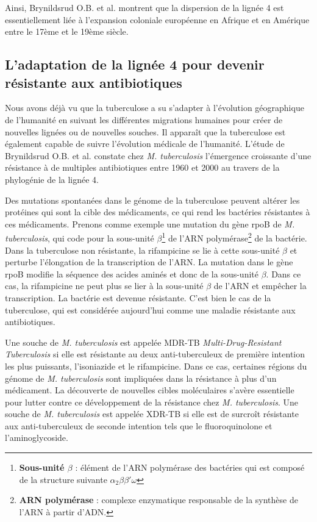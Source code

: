 \documentclass[twoside,a4paper,11pt,frenchb,openany]{report}
\begin{document}
Ainsi, Brynildsrud O.B. et al. montrent que la dispersion de la lignée 4 est essentiellement liée à l'expansion coloniale européenne en Afrique et en Amérique entre le 17ème et le 19ème siècle.


\subsection{L'adaptation de la lignée 4 pour devenir résistante aux antibiotiques}

Nous avons déjà vu que la tuberculose a su s'adapter à l'évolution géographique de l'humanité en suivant les différentes migrations humaines pour créer de nouvelles lignées ou de nouvelles souches. Il apparaît que la tuberculose est également capable de suivre l'évolution médicale de l'humanité. L'étude de Brynildsrud O.B. et al.\cite{brynildsrud} constate chez \textit{M. tuberculosis} l'émergence croissante d'une résistance à de multiples antibiotiques entre 1960 et 2000 au travers de la phylogénie de la lignée 4.

Des mutations spontanées dans le génome de la tuberculose peuvent altérer les protéines qui sont la cible des médicaments, ce qui rend les bactéries résistantes à ces médicaments. Prenons comme exemple une mutation du gène rpoB de \textit{M. tuberculosis}, qui code pour la sous-unité $\beta$\footnote{\textbf{Sous-unité $\beta$} : élément de l'ARN polymérase des bactéries qui est composé de la structure suivante $\alpha_2 \beta \beta' \omega$} de l'ARN polymérase\footnote{\textbf{ARN polymérase} : complexe enzymatique responsable de la synthèse de l'ARN à partir d'ADN.} de la bactérie. Dans la tuberculose non résistante, la rifampicine se lie à cette sous-unité $\beta$ et perturbe l'élongation de la transcription de l'ARN. La mutation dans le gène rpoB modifie la séquence des acides aminés et donc de la sous-unité $\beta$. Dans ce cas, la rifampicine ne peut plus se lier à la sous-unité $\beta$ de l'ARN et empêcher la transcription. La bactérie est devenue résistante. C'est bien le cas de la tuberculose, qui est considérée aujourd'hui comme une maladie résistante aux antibiotiques. 

Une souche de \textit{M. tuberculosis} est appelée MDR-TB \textit{Multi-Drug-Resistant Tuberculosis} si elle est résistante au deux anti-tuberculeux de première intention les plus puissants, l'isoniazide et le rifampicine. Dans ce cas, certaines régions du génome de \textit{M. tuberculosis} sont impliquées dans la résistance à plus d'un médicament. La découverte de nouvelles cibles moléculaires s'avère essentielle pour lutter contre ce développement de la résistance chez \textit{M. tuberculosis}. Une souche de \textit{M. tuberculosis} est appelée XDR-TB si elle est de surcroît résistante aux anti-tuberculeux de seconde intention tels que le fluoroquinolone et l'aminoglycoside.
\end{document}

